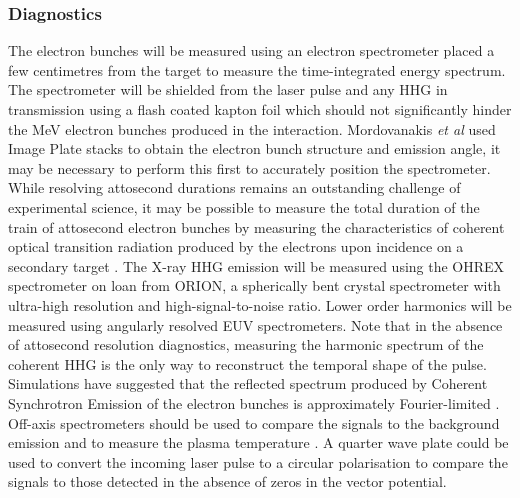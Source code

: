 \subsubsection{Diagnostics}
The electron bunches will be measured using an electron spectrometer placed a few centimetres from the target to measure the time-integrated energy spectrum. The spectrometer will be shielded from the laser pulse and any \ac{HHG} in transmission using a flash coated kapton foil which should not significantly hinder the MeV electron bunches produced in the interaction. Mordovanakis \textit{et al} used Image Plate stacks to obtain the electron bunch structure and emission angle, it may be necessary to perform this first to accurately position the spectrometer. While resolving attosecond durations remains an outstanding challenge of experimental science, it may be possible to measure the total duration of the train of attosecond electron bunches by measuring the characteristics of coherent optical transition radiation produced by the electrons upon incidence on a secondary target \cite{linIsolatedAttosecondElectron2020}. The X-ray \ac{HHG} emission will be measured using the OHREX spectrometer \cite{beiersdorferLineshapeSpectroscopyVery2016} on loan from ORION, a spherically bent crystal spectrometer with ultra-high resolution and high-signal-to-noise ratio. Lower order harmonics will be measured using angularly resolved EUV spectrometers. Note that in the absence of attosecond resolution diagnostics, measuring the harmonic spectrum of the coherent \ac{HHG} is the only way to reconstruct the temporal shape of the pulse. Simulations have suggested that the reflected spectrum produced by Coherent Synchrotron Emission of the electron bunches is approximately Fourier-limited \cite{cousensElectronTrajectoriesAssociated2020}. Off-axis spectrometers should be used to compare the signals to the background emission and to measure the plasma temperature \cite{akliDualChannelXray2010}. A quarter wave plate could be used to convert the incoming laser pulse to a circular polarisation to compare the signals to those detected in the absence of zeros in the vector potential.

